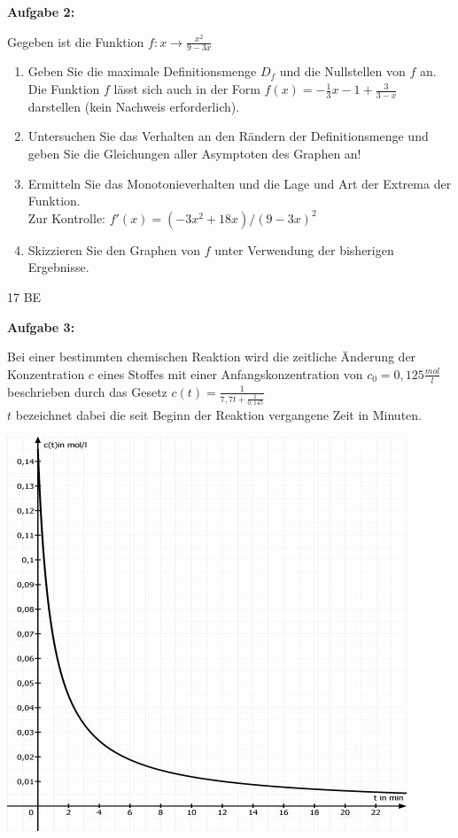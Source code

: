 \documentclass[a4paper,12pt]{article}
\newcommand{\Aufgabe}[1]{
  {
  \vspace*{0.5cm}
  \textsf{\textbf{Aufgabe #1}}
  \vspace*{0.2cm}
  
  }
}
\begin{document}
\Aufgabe{2:} 
Gegeben ist die Funktion $f: x \rightarrow \frac{x^2}{9-3x}$
\begin{enumerate}[label={\alph*)}]
  \item Geben Sie die maximale Definitionsmenge $D_f$ und die Nullstellen von $f$ an.\\
Die Funktion $f$ lässt sich auch in der Form
    $f(x) = - \frac{1}{3}x - 1 + \frac{3}{3-x}$ 
darstellen (kein Nachweis erforderlich).


\item Untersuchen Sie das Verhalten an den Rändern der Definitionsmenge und geben Sie die Gleichungen aller Asymptoten des Graphen an!
\item Ermitteln Sie das Monotonieverhalten und die Lage und Art der Extrema der Funktion.\\
 \lbrack Zur Kontrolle: $f'(x) = (-3x^2+18x) / (9-3x)^2$\rbrack

\item Skizzieren Sie den Graphen von $f$ unter Verwendung der bisherigen Ergebnisse.

\end{enumerate}
\begin{flushright}17 BE \end{flushright}

  \newpage
\Aufgabe{3:}

Bei einer bestimmten chemischen Reaktion wird die zeitliche Änderung der Konzentration $c$ eines Stoffes mit einer Anfangskonzentration von $c_0=0,125 \frac{mol}{l}$ beschrieben durch das Gesetz $c(t) = \frac{1}{7,7t+\frac{1}{0,145}}$\\
$t$ bezeichnet dabei die seit Beginn der Reaktion vergangene Zeit in Minuten.
\begin{center}
    \includegraphics[width=0.6\linewidth]{Q11_210111_3corrected.jpg}
\end{center}
\end{document}
